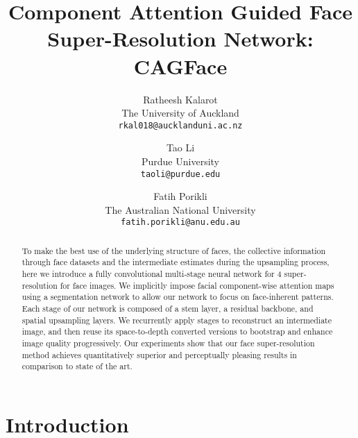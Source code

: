 \documentclass[10pt,twocolumn,letterpaper]{article}
\begin{document}
\title{Component Attention Guided Face Super-Resolution Network: CAGFace}

\author{Ratheesh Kalarot \\
The University of Auckland \\
{\tt\small rkal018@aucklanduni.ac.nz}
\and
Tao Li \\
Purdue University \\
{\tt\small taoli@purdue.edu}
\and
Fatih Porikli \\
The Australian National University \\
{\tt\small fatih.porikli@anu.edu.au}
}

\maketitle
\ifwacvfinal\thispagestyle{empty}\fi


\begin{abstract}
To make the best use of the underlying structure of faces, the collective information through face datasets and the intermediate estimates during the upsampling process, here we introduce a fully convolutional multi-stage neural network for 4 super-resolution for face images. We implicitly impose facial component-wise attention maps using a segmentation network to allow our network to focus on face-inherent patterns. Each stage of our network is composed of a stem layer, a residual backbone, and spatial upsampling layers. We recurrently apply stages to reconstruct an intermediate image, and then reuse its space-to-depth converted versions to bootstrap and enhance image quality progressively. Our experiments show that our face super-resolution method achieves quantitatively superior and perceptually pleasing results in comparison to state of the art.
\end{abstract}
 
\section{Introduction}\label{sec:introduction}
\end{document}
